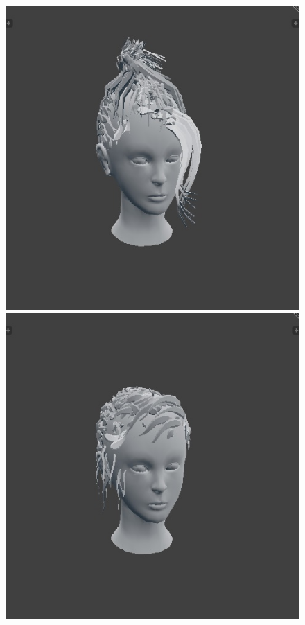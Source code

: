 \documentclass[ %
author={Dillon Keith Diep},
supervisor={Dr. Carl Henrik Ek},
degree={MEng},
title={ART-CG Hair:},
subtitle={Assisted Real-time Content Generation of Stylised Virtual Hair},
type={Research},
year={2017} ]{dissertation}
\begin{document}
\begin{figure}[!h]
		\includegraphics[scale=0.25]{images/outputMesh3}
		\includegraphics[scale=0.25]{images/outputMesh4}\\

\end{figure}
\end{document}
